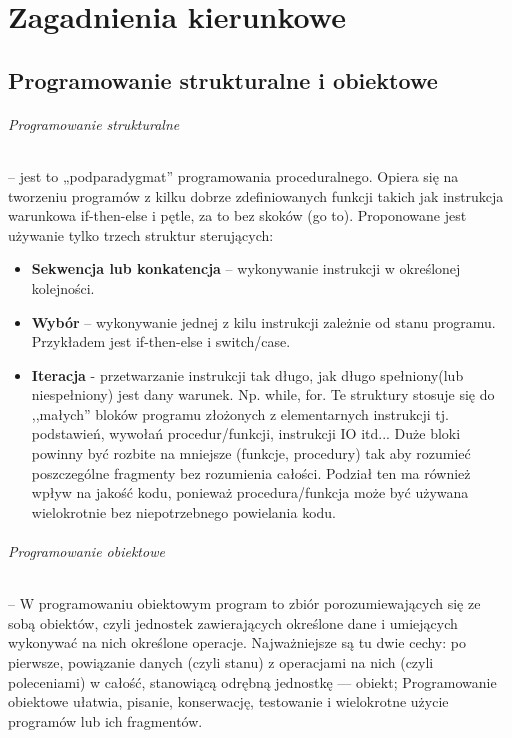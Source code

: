 \documentclass[]{report}
\begin{document}
\part{Zagadnienia kierunkowe}
\bigskip
\chapter{Programowanie strukturalne i obiektowe}
\paragraph{Programowanie strukturalne} – jest to „podparadygmat” programowania proceduralnego. Opiera się na tworzeniu programów z kilku dobrze zdefiniowanych funkcji takich jak instrukcja warunkowa if-then-else i pętle, za to bez skoków (go to). Proponowane jest używanie tylko trzech struktur sterujących:
\begin{itemize}
\item \textbf{Sekwencja lub konkatencja} – wykonywanie instrukcji w określonej kolejności.
\item \textbf{Wybór} – wykonywanie jednej z kilu instrukcji zależnie od stanu programu. Przykładem jest if-then-else i switch/case.
\item \textbf{Iteracja} - przetwarzanie instrukcji tak długo, jak długo spełniony(lub niespełniony) jest dany warunek. Np. while, for.
Te struktury stosuje się do ,,małych'' bloków programu złożonych z elementarnych instrukcji tj. podstawień, wywołań procedur/funkcji, instrukcji IO itd... Duże bloki powinny być rozbite na mniejsze (funkcje, procedury) tak aby rozumieć poszczególne fragmenty bez rozumienia całości. Podział ten ma również wpływ na jakość kodu, ponieważ procedura/funkcja może być używana wielokrotnie bez niepotrzebnego powielania kodu.
\end{itemize}
\medskip 

\paragraph{Programowanie obiektowe}
 – W programowaniu obiektowym program to zbiór porozumiewających się ze sobą obiektów, czyli jednostek zawierających określone dane i umiejących wykonywać na nich określone operacje. Najważniejsze są tu dwie cechy: po pierwsze, powiązanie danych (czyli stanu) z operacjami na nich (czyli poleceniami) w całość, stanowiącą odrębną jednostkę — obiekt; Programowanie obiektowe ułatwia, pisanie, konserwację, testowanie i wielokrotne użycie programów lub ich fragmentów.
\medskip 
\end{document}
